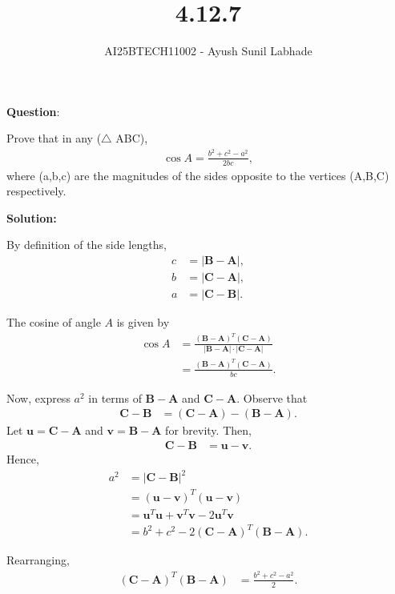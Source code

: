 \documentclass{beamer}
\theoremstyle{remark}
\let\vec\mathbf
\numberwithin{equation}{section}
\begin{document}
\title{4.12.7}
\author{AI25BTECH11002 - Ayush Sunil Labhade}
{\let\newpage\relax\maketitle}


\textbf{Question}:

Prove that in any ($\triangle$ ABC),
\begin{align}
\cos A = \frac{b^{2}+c^{2}-a^{2}}{2bc},
\end{align}
where (a,b,c) are the magnitudes of the sides opposite to the vertices (A,B,C) respectively.

\textbf{Solution:}

By definition of the side lengths,
\begin{align}
c &= |\vec{B} - \vec{A}|, \\
b &= |\vec{C} - \vec{A}|, \\
a &= |\vec{C} - \vec{B}|.
\end{align}

The cosine of angle \(A\) is given by
\begin{align}
\cos A &= \frac{(\vec{B} - \vec{A})^T (\vec{C} - \vec{A})}{|\vec{B} - \vec{A}| \cdot |\vec{C} - \vec{A}|} \\
       &= \frac{(\vec{B} - \vec{A})^T (\vec{C} - \vec{A})}{bc}.
\end{align}

Now, express \(a^2\) in terms of \(\vec{B} - \vec{A}\) and \(\vec{C} - \vec{A}\). Observe that
\begin{align}
\vec{C} - \vec{B} &= (\vec{C} - \vec{A}) - (\vec{B} - \vec{A}).
\end{align}
Let \(\vec{u} = \vec{C} - \vec{A}\) and \(\vec{v} = \vec{B} - \vec{A}\) for brevity. Then,
\begin{align}
\vec{C} - \vec{B} &= \vec{u} - \vec{v}.
\end{align}
Hence,
\begin{align}
a^2 &= |\vec{C} - \vec{B}|^2 \\
    &= (\vec{u} - \vec{v})^T (\vec{u} - \vec{v}) \\
    &= \vec{u}^T \vec{u} + \vec{v}^T \vec{v} - 2 \vec{u}^T \vec{v} \\
    &= b^2 + c^2 - 2 (\vec{C} - \vec{A})^T (\vec{B} - \vec{A}).
\end{align}

Rearranging,
\begin{align}
(\vec{C} - \vec{A})^T (\vec{B} - \vec{A}) &= \frac{b^2 + c^2 - a^2}{2}.
\end{align}
\end{document}
